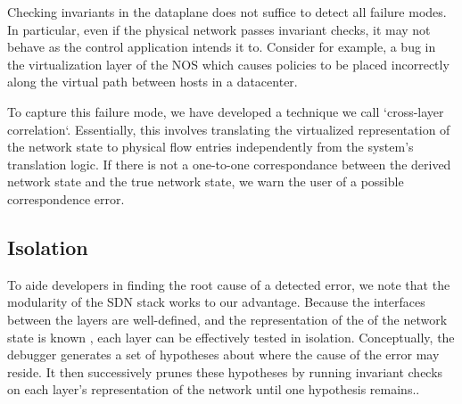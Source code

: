 Checking invariants in the dataplane does not suffice to detect all failure modes. In
particular, even if the physical network passes invariant checks, it may not behave as
the control application intends it to. Consider for example, a bug in the
virtualization layer of the NOS which causes policies to be placed
incorrectly along the virtual path between hosts in a datacenter.

To capture this failure mode, we have developed a technique we call `cross-layer
correlation`. Essentially, this involves translating the
virtualized representation of the network state to physical flow entries
independently from the system's translation logic. If
there is not a one-to-one correspondance between the derived network
state and the true network state, we warn the user of a possible
correspondence error.


\subsection{Isolation}
\label{sec:isolation}

To aide developers in finding the root cause of a detected error, we note that
the modularity of the SDN stack works to our advantage. Because the interfaces
between the layers are well-defined, and the representation of the 
of the network state is known \apriori, each layer can be effectively tested in
isolation. Conceptually, the debugger generates a set of hypotheses about
where the cause of the error may reside. It then successively prunes these
hypotheses by running invariant checks on each layer's representation of the
network until one hypothesis remains..
